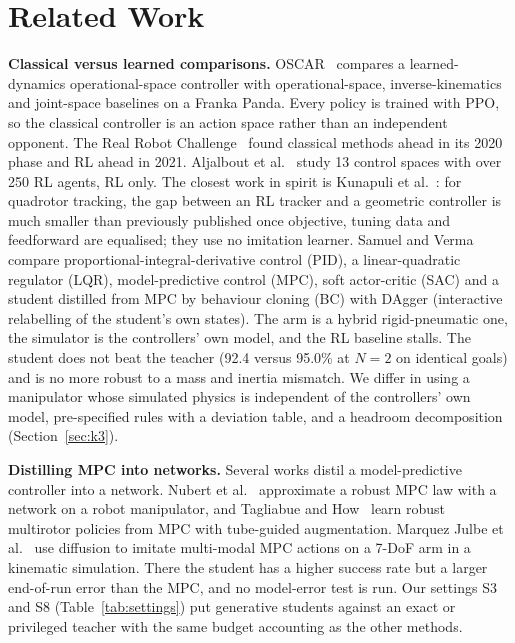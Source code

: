\section{Related Work}
\label{sec:related}

\textbf{Classical versus learned comparisons.} OSCAR~\cite{wong2021oscar} compares a learned-dynamics operational-space controller with operational-space, inverse-kinematics and joint-space baselines on a Franka Panda. Every policy is trained with PPO, so the classical controller is an action space rather than an independent opponent. The Real Robot Challenge~\cite{bauer2021rrc} found classical methods ahead in its 2020 phase and RL ahead in 2021. Aljalbout et al.~\cite{aljalbout2023action} study 13 control spaces with over 250 RL agents, RL only. The closest work in spirit is Kunapuli et al.~\cite{kunapuli2025leveling}: for quadrotor tracking, the gap between an RL tracker and a geometric controller is much smaller than previously published once objective, tuning data and feedforward are equalised; they use no imitation learner. Samuel and Verma~\cite{samuel2026hybrid} compare proportional-integral-derivative control (PID), a linear-quadratic regulator (LQR), model-predictive control (MPC), soft actor-critic (SAC) and a student distilled from MPC by behaviour cloning (BC) with DAgger (interactive relabelling of the student's own states). The arm is a hybrid rigid-pneumatic one, the simulator is the controllers' own model, and the RL baseline stalls. The student does not beat the teacher (92.4 versus 95.0\% at $N{=}2$ on identical goals) and is no more robust to a mass and inertia mismatch. We differ in using a manipulator whose simulated physics is independent of the controllers' own model, pre-specified rules with a deviation table, and a headroom decomposition (Section~\ref{sec:k3}).

\textbf{Distilling MPC into networks.} Several works distil a model-predictive controller into a network. Nubert et al.~\cite{nubert2019safe} approximate a robust MPC law with a network on a robot manipulator, and Tagliabue and How~\cite{tagliabue2023efficient} learn robust multirotor policies from MPC with tube-guided augmentation. Marquez Julbe et al.~\cite{marquez2025diffusion} use diffusion to imitate multi-modal MPC actions on a 7-DoF arm in a kinematic simulation. There the student has a higher success rate but a larger end-of-run error than the MPC, and no model-error test is run. Our settings S3 and S8 (Table~\ref{tab:settings}) put generative students against an exact or privileged teacher with the same budget accounting as the other methods.

